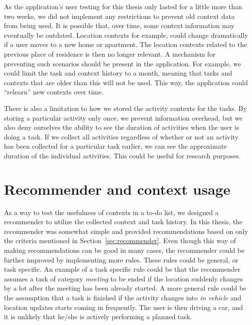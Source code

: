 As the application's user testing for this thesis only lasted for a little more than two weeks, we did not implement any restrictions to prevent old context data from being used. It is possible that, over time, some context information may eventually be outdated. Location contexts for example, could change dramatically if a user moves to a new home or apartment. The location contexts related to the previous place of residence is then no longer relevant. A mechanism for preventing such scenarios should be present in the application. For example, we could limit the task and context history to a month, meaning that tasks and contexts that are older than this will not be used. This way, the application could ``relearn'' new contexts over time.

There is also a limitation to how we stored the activity contexts for the tasks. By storing a particular activity only once, we prevent information overhead, but we also deny ourselves the ability to see the duration of activities when the user is doing a task. If we collect all activities regardless of whether or not an activity has been collected for a particular task earlier, we can see the approximate duration of the individual activities. This could be useful for research purposes.



\section{Recommender and context usage}

As a way to test the usefulness of contexts in a to-do list, we designed a recommender to utilize the collected context and task history. In this thesis, the recommender was somewhat simple and provided recommendations based on only the criteria mentioned in Section~\ref{sec:recommender}. Even though this way of making recommendations can be good in many cases, the recommender could be further improved by implementing more rules. These rules could be general, or task specific. An example of a task specific rule could be that the recommender assumes a task of category \emph{meeting} to be ended if the location suddenly changes by a lot after the meeting has been already started. A more general rule could be the assumption that a task is finished if the activity changes into \emph{in vehicle} and location updates starts coming in frequently. The user is then driving a car, and it is unlikely that he/she is actively performing a planned task.

